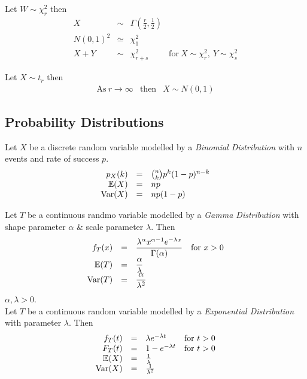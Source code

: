 \documentclass[11pt,a4paper]{article}
\begin{document}
Let $W\sim\chi_r^2$ then
\[\begin{array}{rcll}
X&\sim&\Gamma\left(\frac{r}{2},\frac{1}{2}\right)\\
N(0,1)^2&\simeq&\chi_1^2\\
X+Y&\sim&\chi_{r+s}^2&\mathrm{for}\ X\sim\chi_r^2,\ Y\sim\chi_s^2
\end{array}\]

Let $X\sim t_r$ then
\[\begin{array}{rcll}
\mathrm{As}\ r\to\infty&\mathrm{then}&X\sim N(0,1)
\end{array}\]

\newpage
\subsection{Probability Distributions}

Let $X$ be a discrete random variable modelled by a \textit{Binomial Distribution} with $n$ events and rate of success $p$.\\
\[\begin{array}{rcl}
p_X(k)&=&{n\choose k}p^k(1-p)^{n-k}\\
\mathbb{E}(X)&=&np\\
\mathrm{Var}(X)&=&np(1-p)
\end{array}\]

Let $T$ be a continuous randmo variable modelled by a \textit{Gamma Distribution} with shape parameter $\alpha$ \& scale parameter $\lambda$. Then
\[\begin{array}{rcll}
f_T(x)&=&\dfrac{\lambda^\alpha x^{\alpha-1}e^{-\lambda x}}{\Gamma(\alpha)}&\mathrm{for\ }x>0\\
\mathbb{E}(T)&=&\dfrac{\alpha}{\lambda}\\
\mathrm{Var}(T)&=&\dfrac{\alpha}{\lambda^2}
\end{array}\]
\NB $\alpha,\lambda>0$.\\

Let $T$ be a continuous random variable modelled by a \textit{Exponential Distribution} with parameter $\lambda$. Then
\[\begin{array}{rcll}
f_T(t)&=&\lambda e^{-\lambda t}&\mathrm{for\ }t>0\\
F_T(t)&=&1-e^{-\lambda t}&\mathrm{for\ }t>0\\
\mathbb{E}(X)&=&\frac{1}{\lambda}\\
\mathrm{Var}(X)&=&\frac{1}{\lambda^2}
\end{array}\]
\end{document}

